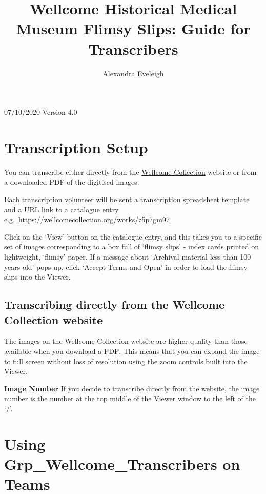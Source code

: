 \documentclass[
  openany]{book}
\title{Wellcome Historical Medical Museum Flimsy Slips: Guide for Transcribers}
\author{Alexandra Eveleigh}
\date{}
\begin{document}
\maketitle

{
\setcounter{tocdepth}{1}
\tableofcontents
}
07/10/2020
Version 4.0

\hypertarget{transcription-setup}{%
\chapter{Transcription Setup}\label{transcription-setup}}

You can transcribe either directly from the \href{https://wellcomecollection.org}{Wellcome Collection} website or from a downloaded PDF of the digitised images.

Each transcription volunteer will be sent a transcription spreadsheet template and a URL link to a catalogue entry
e.g.~\url{https://wellcomecollection.org/works/z5p7gm97}

Click on the `View' button on the catalogue entry, and this takes you to a specific set of images corresponding to a box full of `flimsy slips' - index cards printed on lightweight, `flimsy' paper. If a message about `Archival material less than 100 years old' pops up, click `Accept Terms and Open' in order to load the flimsy slips into the Viewer.

\hypertarget{transcribing-directly-from-the-wellcome-collection-website}{%
\section{Transcribing directly from the Wellcome Collection website}\label{transcribing-directly-from-the-wellcome-collection-website}}

The images on the Wellcome Collection website are higher quality than those available when you download a PDF. This means that you can expand the image to full screen without loss of resolution using the zoom controls built into the Viewer.

\textbf{Image Number} If you decide to transcribe directly from the website, the image number is the number at the top middle of the Viewer window to the left of the `/'.

\hypertarget{using-grp_wellcome_transcribers-on-teams}{%
\chapter{Using Grp\_Wellcome\_Transcribers on Teams}\label{using-grp_wellcome_transcribers-on-teams}}
\end{document}
